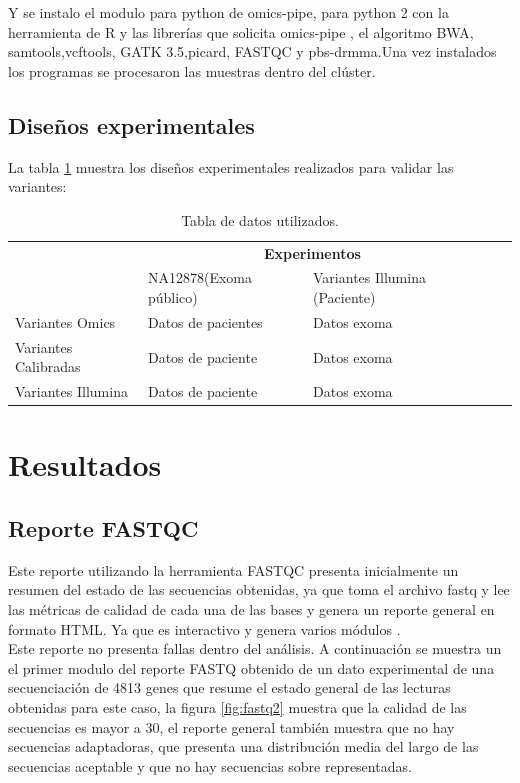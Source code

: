 {	Y se instalo el modulo para python de omics-pipe, para python 2 con la herramienta de R y las librerías que solicita omics-pipe\cite{Fisch2015} , el algoritmo BWA, samtools,vcftools, GATK 3.5,picard, FASTQC y pbs-drmma.Una vez instalados los programas se procesaron las muestras dentro del clúster.  

\subsection*{Diseños experimentales}

La tabla \ref{tabla:exp} muestra los diseños experimentales realizados para validar las variantes:

\begin{table}[htb]
	\begin{tabular}{|l|l|l|l|l|}
		\hline
		& \multicolumn{2}{c|}{\textbf{Experimentos}} \\
		\cline{2-3} 
		& NA12878(Exoma público)  & Variantes Illumina (Paciente)  \\ \cline{2-3}
		\hline 
		\multirow{1}{4cm}{Variantes Omics} & Datos de pacientes & Datos exoma   \\ \cline{2-3}
		\hline 
		\multirow{1}{4cm}{Variantes Calibradas} & Datos de paciente & Datos exoma    \\ \cline{2-3}
		\hline
		\multirow{1}{4cm}{Variantes Illumina} & Datos de paciente & Datos exoma     \\ \cline{2-3}
		\hline
	\end{tabular}
	\caption{Tabla de datos utilizados.}
	\label{tabla:exp}
\end{table}

\section{Resultados}
	\subsection*{Reporte FASTQC}}

Este reporte utilizando la herramienta FASTQC presenta inicialmente un resumen del estado de las secuencias obtenidas, ya que toma el archivo fastq y lee las métricas de calidad de cada una de las bases y genera un reporte general en formato HTML. Ya que es interactivo y genera varios módulos \cite{Babraham2016}. \\

Este reporte no presenta fallas dentro del análisis. A continuación se muestra un el primer modulo del reporte FASTQ obtenido de un dato experimental de una secuenciación de 4813 genes que resume el estado general de las lecturas obtenidas para este caso, la figura \ref{fig:fastq2} muestra que la calidad de las secuencias es mayor a 30, el reporte general también muestra que no hay secuencias adaptadoras, que presenta una distribución media del largo de las secuencias aceptable y que no hay secuencias sobre representadas.  \\

